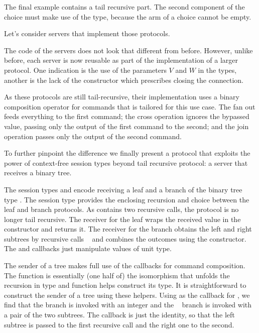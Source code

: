\documentclass[acmsmall,screen,anonymous,review]{acmart}
\begin{document}
The final example {\Amanyunaryp} contains a tail recursive part. The
second component of the choice must make use of the {\Atcfskip} type,
because the arm of a choice cannot be empty.

Let's consider servers that implement those protocols.
\cstCmdExamples

The code of the servers does not look that different from
before. However, unlike before, each server is now reusable as part of
the implementation of a larger protocol. One indication is the use of
the parameters $V$ and $W$ in the types, another is the lack of the
{\ACEND} constructor which prescribes closing the connection.

As these protocols are still tail-recursive, their implementation uses
a binary composition operator for commands that is tailored for this
use case. The fan out feeds everything to the first command; the
cross operation ignores the bypassed value, passing only the output of
the first command to the second; and the join operation passes only
the output of the second command.
\cstTailComposition


To further pinpoint the difference we finally present a protocol that
exploits the power of context-free session types beyond tail recursive
protocol: a server that receives a binary tree.
\cstTreep

The session types {\Aleafp} and {\Abranchp} encode receiving a leaf and
a branch of the binary tree type {\AIntTree}. The session type
{\Atreep} provides the enclosing recursion and choice between the leaf
and branch protocols. As {\Abranchp} contains two recursive calls,
the protocol {\Atreep} is no longer tail recursive.
\cstRecvTree
The receiver for the leaf wraps the received value in the {\ACLeaf}
constructor and returns it.
The receiver for the branch obtains the left and right subtrees by
recursive calls {\ACONTINUE~\Azero} and combines the outcomes using
the {\ACBranch} constructor. The {\Asplit} and {\Across} callbacks
just manipulate values of unit type.

The sender of a tree makes full use of the callbacks for command
composition. 
\cstSendTree
The function {\AsplitTree} is essentially (one half of) the
isomorphism that unfolds the recursion in type {\AIntTree} and
function {\AIntTreeF} helps construct its type. It is straightforward
to construct the sender of a tree using these helpers. Using
{\AsplitTree} as the callback for {\ACSELECT}, we find that the
{\Azero} branch is invoked with an integer and the {\Asuc~\Azero}
branch is invoked with a pair of the two subtrees. The {\Asplit}
callback is just the identity, so that the left subtree is passed to
the first recursive call and the right one to the second.
\end{document}
